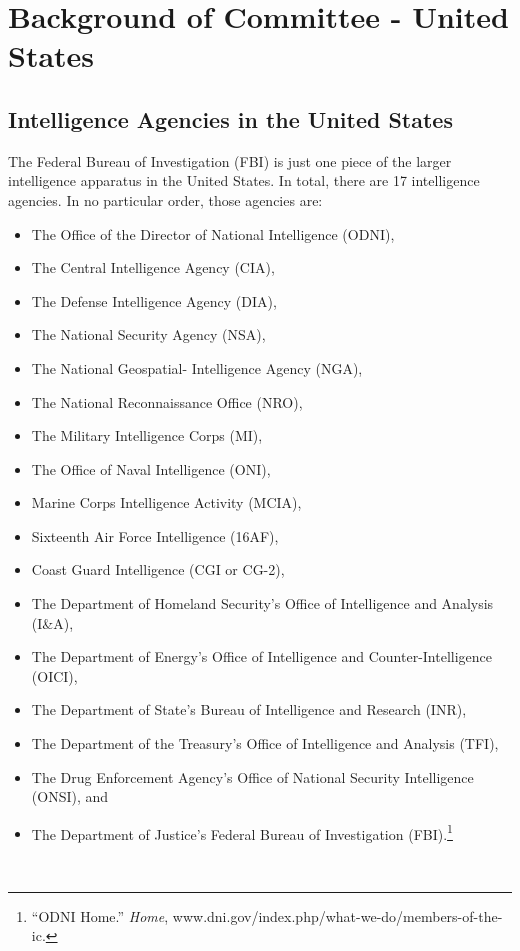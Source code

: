 \documentclass[10pt, letterpaper]{article}
\begin{document}
\newpage
\section{Background of Committee - United States}

\subsection{Intelligence Agencies in the United States}

The Federal Bureau of Investigation (FBI) is just one piece of the
larger intelligence apparatus in the United States. In total, there are
17 intelligence agencies. In no particular order, those agencies are:

\begin{multicols}{2}
\begin{itemize}
\item
  The Office of the Director of National Intelligence (ODNI),
\item
  The Central Intelligence Agency (CIA),
\item
  The Defense Intelligence Agency (DIA),
\item
  The National Security Agency (NSA),
\item
  The National Geospatial- Intelligence Agency (NGA),
\item
  The National Reconnaissance Office (NRO),
\item
  The Military Intelligence Corps (MI),
\item
  The Office of Naval Intelligence (ONI),
\item
  Marine Corps Intelligence Activity (MCIA),
\item
  Sixteenth Air Force Intelligence (16AF),
\item
  Coast Guard Intelligence (CGI or CG-2),
\item
  The Department of Homeland Security's Office of Intelligence and
  Analysis (I\&A),
\item
  The Department of Energy's Office of Intelligence and
  Counter-Intelligence (OICI),
\item
  The Department of State's Bureau of Intelligence and Research (INR),
\item
  The Department of the Treasury's Office of Intelligence and Analysis
  (TFI),
\item
  The Drug Enforcement Agency's Office of National Security Intelligence
  (ONSI), and

\item  The Department of Justice's Federal Bureau of Investigation
  (FBI).\footnote{``ODNI Home.'' \emph{Home},
    www.dni.gov/index.php/what-we-do/members-of-the-ic.}
\end{itemize}
\end{multicols} \\
\end{document}
